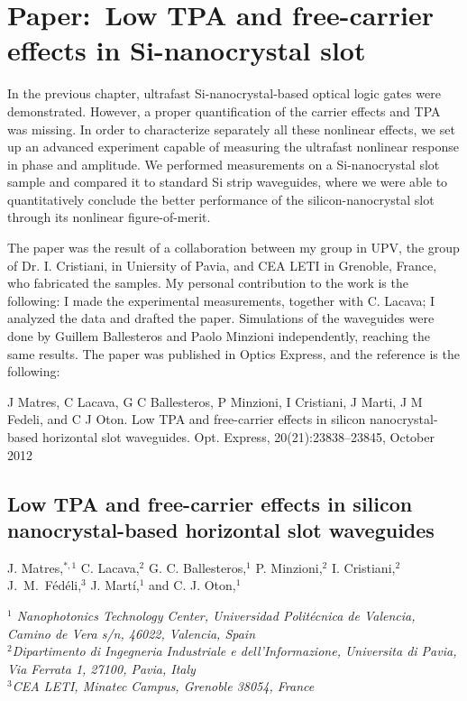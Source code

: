 \chapter{Paper:~Low TPA and free-carrier effects in Si-nanocrystal slot}
\label{ch:articleTimeRes}
\pagestyle{plain}

In the previous chapter, ultrafast Si-nanocrystal-based optical logic gates were demonstrated. However, a proper quantification of the carrier effects and TPA was missing. In order to characterize separately all these nonlinear effects, we set up an advanced experiment capable of measuring the ultrafast nonlinear response in phase and amplitude. We performed measurements on a Si-nanocrystal slot sample and compared it to standard Si strip waveguides, where we were able to quantitatively conclude the better performance of the silicon-nanocrystal slot through its nonlinear figure-of-merit.

The paper was the result of a collaboration between my group in UPV, the group of Dr. I. Cristiani, in Uniersity of Pavia, and CEA LETI in Grenoble, France, who fabricated the samples. My personal contribution to the work is the following: I made the experimental measurements, together with C. Lacava; I analyzed the data and drafted the paper. Simulations of the waveguides were done by Guillem Ballesteros and Paolo Minzioni independently, reaching the same results. The paper was published in Optics Express, and the reference is the following:

\vspace{1.5cm}

J Matres, C Lacava, G C Ballesteros, P Minzioni, I Cristiani, J Marti, J M Fedeli, and C J Oton. Low TPA and free-carrier effects in silicon nanocrystal-based horizontal slot waveguides. Opt. Express, 20(21):23838–23845, October 2012

\newpage
\begin{center}
\section*{Low TPA and free-carrier effects in silicon nanocrystal-based horizontal slot waveguides}
{J. Matres,$^{*,1}$ C. Lacava,$^2$ G. C. Ballesteros,$^1$ P. Minzioni,$^2$ I. Cristiani,$^2$ J.~M.~F\'ed\'eli,$^3$ J. Mart\'i,$^1$ and C. J. Oton,$^1$} 
\end{center}
\noindent
\textit{$^1$ Nanophotonics Technology Center, Universidad Polit\'ecnica de Valencia, Camino de Vera s/n, 46022, Valencia, Spain\\
$^2$Dipartimento di Ingegneria Industriale e dell'Informazione, Universita di Pavia, Via Ferrata 1, 27100, Pavia, Italy\\
$^3$CEA LETI, Minatec Campus, Grenoble 38054, France}


